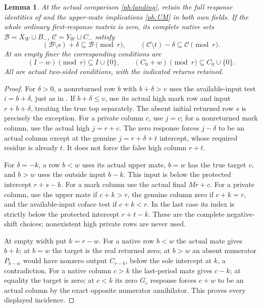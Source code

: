 \documentclass[11pt,a4paper]{amsart}
\numberwithin{equation}{section}
\theoremstyle{plain}
\newtheorem{lemma}[theorem]{Lemma}
\theoremstyle{definition}
\begin{document}
\begin{lemma}
\label{ph:ordinary-zero}
At the actual comparison \eqref{ph:landing}, retain the full response
identities of  and the
upper-mate implications \eqref{ph:UM} in both own fields.  If the whole
ordinary first-response matrix is zero, its complete native sets
\(\mathcal B=X_W\sqcup B_-\), \(\mathcal C=Y_W\sqcup C_-\) satisfy
\[
 (\mathcal B\setminus s)+\delta\subseteq\mathcal B\pmod r,
 \qquad
 (\mathcal C\setminus t)-\delta\subseteq\mathcal C\pmod r.
\]
At an empty finer the corresponding conditions are
\[
 (I-w)\pmod r\subseteq I\cup\{0\},\qquad
 (C_0+w)\pmod r\subseteq C_0\cup\{0\}.
\]
All are actual two-sided conditions, with the indicated returns retained.
\end{lemma}
\begin{proof}
For \(\delta>0\), a nonreturned row \(b\) with \(b+\delta>v\)
uses the available-input test \(i=b+\delta\), just as in
.  If \(b+\delta\le v\), use its actual high
mark row and input \(r+b+\delta\), treating the true top separately.
The absent initial returned row \(s\) is precisely the exception.
For a private column \(c\), use \(j=c\); for a nonreturned mark column,
use the actual high \(j=r+c\).
The zero response forces \(j-\delta\) to be an actual column except
at the genuine \(j=r+\delta+t\) intercept, whose required residue
is already \(t\).  It does not force the false high column \(r+t\).

For \(\delta=-k\), a row \(b<w\) uses its actual upper mate,
\(b=w\) has the true target \(v\), and \(b>w\) uses the outside
input \(b-k\).  This input is below the protected intercept
\(r+s-k\).  For a mark column use the actual final \(Mr+c\).
For a private column, use the upper mate if \(c+k>r\), the genuine
column zero if \(c+k=r\), and the available-input coface test if
\(c+k<r\).  In the last case its index is strictly below the
protected intercept \(r+t-k\).
These are the complete negative-shift choices; nonexistent high
private rows are never used.

At empty width put \(k=r-w\).
For a native row \(b<w\) the actual mate gives \(b+k\); at \(b=w\)
the target is the real returned zero; at \(b>w\) an absent numerator
\(P_{b-w}\) would have nonzero output \(C_{r-b}\), below the sole
intercept at \(k\), a contradiction.
For a native column \(c>k\) the last-period mate gives \(c-k\);
at equality the target is zero; at \(c<k\) its zero \(G_c\) response
forces \(c+w\) to be an actual column by the exact opposite numerator
annihilator.  This proves every displayed incidence.
\end{proof}
\end{document}
